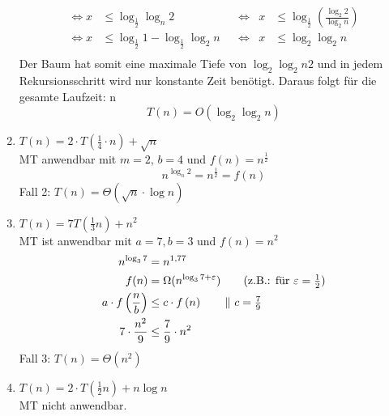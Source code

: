 \documentclass[a4paper,10pt]{scrartcl}
\begin{document}
\begin{enumerate}
\begin{align*}
        \Leftrightarrow x &\leq \log_\frac{1}{2} \log_n 2 && \Longleftrightarrow & x & \leq \log_\frac{1}{2} \left(\frac{\log_2 2}{\log_2 n}\right)\\
        \Leftrightarrow x & \leq  \log_\frac{1}{2} 1 - \log_\frac{1}{2} \log_2 n && \Longleftrightarrow & x & \leq \log_2 \log_2 n\\
        \end{align*}
        Der Baum hat somit eine maximale Tiefe von $\log_2 \log_2 n2$ und in jedem Rekursionsschritt wird nur konstante Zeit benötigt. Daraus folgt für die gesamte Laufzeit:
       n \[T(n) = O(\log_2 \log_2 n)\]
\item   $T(n) = 2 \cdot T\left(\frac{1}{4} \cdot n\right) + \sqrt{n}$\\
        MT anwendbar mit $m = 2$, $b = 4$ und $f(n) = n^{\frac{1}{2}}$\\
        \[ n^{\log_n 2} = n^{\frac{1}{2}} = f(n) \]
        Fall 2: $T(n) = \Theta(\sqrt{n} \cdot \log n)$
\item   $T(n) = 7 T(\frac{1}{3}n) + n^2$\\
        MT ist anwendbar mit $a = 7, b = 3$ und $f(n) = n^2$
        \begin{align*}
        n^{\log_3 7} &= n^{1,77}\\
        f(n) &= \Omega(n^{\log_3 7 + \varepsilon}) \tag{z.B.: für $\varepsilon = \frac{1}{2}$}\\
            a \cdot f\left(\frac{n}{b}\right) &\leq c \cdot f\left(n\right) \tag*{$\|\ c = \frac{7}{9}$} \\
            7 \cdot \frac{n^2}{9} &\leq \frac{7}{9} \cdot n^2
        \end{align*}
        Fall 3: $T(n) = \Theta(n^2)$
\item   $T(n) = 2 \cdot T\left(\frac{1}{2}n\right) + n \log n$\\
    MT nicht anwendbar.\\
        \begin{center}
        \end{center}
    

\end{enumerate}
\end{document}
